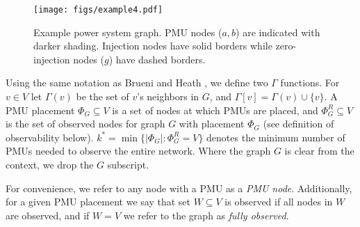 \begin{figure}[t]
\centering
\texttt{[image: figs/example4.pdf]}
\caption{Example power system graph. PMU nodes ($a,b$) are indicated with darker shading. Injection nodes have solid borders while zero-injection nodes  ($g$) have dashed borders.}
\label{fig:example}
\end{figure}

Using the same notation as Brueni and Heath \cite{Brueni05}, we define two $\Gamma$ functions. For $v\in V$ let $\Gamma(v)$ be the set of $v$'s neighbors in $G$, and $\Gamma[v] = \Gamma(v)\cup \{v\}$. 
A PMU placement $\Phi_G \subseteq V$ is a set of nodes at which PMUs are placed,
and $\Phi^R_G\subseteq V$ is the set of observed nodes for graph $G$ with placement $\Phi_G$ (see definition of observability below). %
$k^* = \min \{|\Phi_G|:\Phi^R_G=V\}$ denotes the minimum number of PMUs needed to observe the entire network. Where the graph $G$ is clear from the context, we drop the $G$ subscript.


For convenience, we refer to any node with a PMU as a \emph{PMU node}. Additionally, for a given PMU placement we say that set $W\subseteq V$ is observed if all nodes in $W$ are observed, and if $W=V$ we refer to the graph as \emph{fully observed}. 


